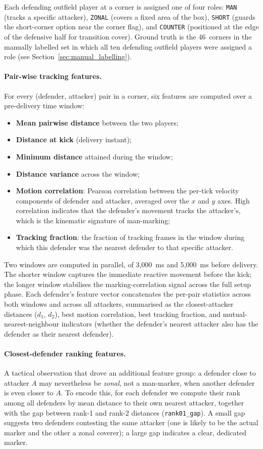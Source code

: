 Each defending outfield player at a corner is assigned one of four roles:
\texttt{MAN} (tracks a specific attacker), \texttt{ZONAL} (covers a fixed area
of the box), \texttt{SHORT} (guards the short-corner option near the corner
flag), and \texttt{COUNTER} (positioned at the edge of the defensive half for
transition cover). Ground truth is the 46~corners in the manually labelled set
in which all ten defending outfield players were assigned a role
(see Section~\ref{sec:manual_labelling}).

\paragraph{Pair-wise tracking features.}
For every (defender, attacker) pair in a corner, six features are computed
over a pre-delivery time window:
\begin{itemize}
  \item \textbf{Mean pairwise distance} between the two players;
  \item \textbf{Distance at kick} (delivery instant);
  \item \textbf{Minimum distance} attained during the window;
  \item \textbf{Distance variance} across the window;
  \item \textbf{Motion correlation}: Pearson correlation between the
        per-tick velocity components of defender and attacker, averaged over
        the $x$ and $y$ axes. High correlation indicates that the defender's
        movement tracks the attacker's, which is the kinematic signature
        of man-marking;
  \item \textbf{Tracking fraction}: the fraction of tracking frames in the
        window during which this defender was the nearest defender to that
        specific attacker.
\end{itemize}
Two windows are computed in parallel, of 3,000~ms and 5,000~ms before delivery.
The shorter window captures the immediate reactive movement before the kick;
the longer window stabilises the marking-correlation signal across the full
setup phase. Each defender's feature vector concatenates the per-pair statistics
across both windows and across all attackers, summarised as the closest-attacker
distances ($d_1$, $d_2$), best motion correlation, best tracking fraction,
and mutual-nearest-neighbour indicators (whether the defender's nearest
attacker also has the defender as their nearest defender).

\paragraph{Closest-defender ranking features.}
A tactical observation that drove an additional feature group: a defender close
to attacker $A$ may nevertheless be \emph{zonal}, not a man-marker, when another
defender is even closer to $A$. To encode this, for each defender we compute
their rank among all defenders by mean distance to their own nearest attacker,
together with the gap between rank-1 and rank-2 distances
(\texttt{rank01\_gap}).  A small gap suggests two defenders contesting the same
attacker (one is likely to be the actual marker and the other a zonal coverer);
a large gap indicates a clear, dedicated marker.


